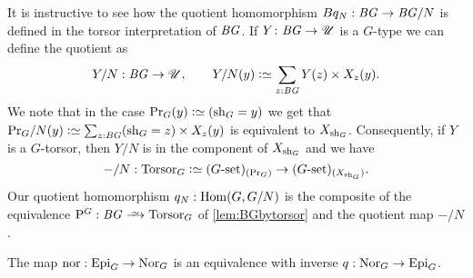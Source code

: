 \begin{remark}
It is instructive to see how the quotient homomorphism $Bq_N:\mathit{B}\mathit{G}\to \mathit{B}\mathit{G}/N$ is defined in the torsor interpretation of $\mathit{B}\mathit{G}$.  If $Y\colon \mathit{B}\mathit{G}\to{\mathscr{U}}$ is a $G$-type we can define the quotient as
$$
Y/N:\BG\to\UU,\qquad Y/N(y)\defequi\sum_{z:\BG}Y(z)\times X_z(y).
$$
We note that in the case $\princ G(y)\defequi (\shape_G=y)$ we get
that
$
\princ G /N(y)\defequi\sum_{z:\BG}(\shape_G=z)\times X_z(y)
$
is equivalent to $X_{\mathrm{sh}_G}$.  Consequently, if $Y$ is a $G$-torsor, then $Y/N$ is in the component of $X_{\mathrm{sh}_G}$ and we have
$$-/N:\typetorsor_G\defequi (G\text{-set})_{(\princ G)}\to (G\text{-set})_{(X_{\shape_G})}.
$$ Our quotient homomorphism $q_N:\Hom(G,G/N)$ is the composite of the equivalence $\pathsp{}^G:\BG\we\typetorsor_G$ of \cref{lem:BGbytorsor} and the quotient map $-/N$.
\end{remark}
\begin{lemma}
  \label{lem:qeq}
  The map $\nor:\typeepi_G\to\typenormal_G$ is an equivalence with inverse $q:\mathrm{Nor}_G\to\mathrm{Epi}_G$.
\end{lemma}
